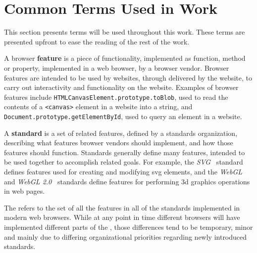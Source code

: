 \section{Common Terms Used in Work}
\label{intro:terms}

This section presents terms will be used throughout this work.  These terms are
presented upfront to ease the reading of the rest of the work.

A browser \textbf{feature} is a piece of functionality, implemented as
\JS function, method or property, implemented in a web browser, by a browser
vendor.  Browser features are intended to be used by websites, through
\JS delivered by the website, to carry out interactivity and functionality
on the website.  Examples of browser features include
\texttt{HTMLCanvasElement.prototype.toBlob}, used to read the contents of
a \texttt{<canvas>} element in a website into a string, and
\texttt{Document.prototype.getElementById}, used to query an element in a
website.

A \textbf{standard} is a set of related features, defined by a standards
organization, describing what features browser vendors should implement, and
how those features should function.  Standards generally define many features,
intended to be used together to accomplish related goals.  For example, the
\textit{SVG}~\cite{svg2011standard} standard defines features used for creating
and modifying \gls{svg} elements, and the \textit{WebGL}~\cite{webgl2015standard} and
\textit{WebGL 2.0}~\cite{webgl22018standard} standards define features
for performing 3d graphics operations in web pages.

The \textbf{\WAPI} refers to the set of all the features in all of the standards
implemented in modern web browsers. While at any point in time different
browsers will have implemented different parts of the \WAPI, those differences
tend to be temporary, minor and mainly due to differing organizational
priorities regarding newly introduced standards.
